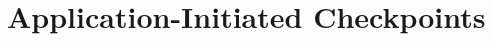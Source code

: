 \documentclass{article}
\begin{document}
%
%
%
%
%
%
%


\section{Application-Initiated Checkpoints}
\end{document}
